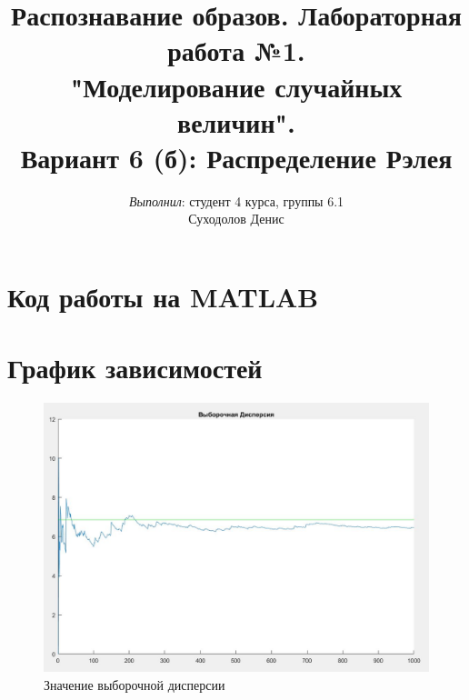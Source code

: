 \documentclass[12pt]{article} %
\begin{document}

\title{Распознавание образов. Лабораторная работа №1. \\
	"Моделирование случайных величин".\\
	Вариант 6 (б): Распределение Рэлея}
\date{}
\author{\textit{Выполнил}: студент 4 курса, группы 6.1 \\
	Суходолов Денис}
        
\maketitle

\begin{spacing}{1} %
\section{Код работы на MATLAB}

\section{График зависимостей}
\begin{figure}[h]
	\begin{center}
		\includegraphics[width = 18cm]{1.jpg}
		\caption{Значение выборочной дисперсии}
	\end{center}
\end{figure}
~\\
































\end{spacing}
\end{document}
